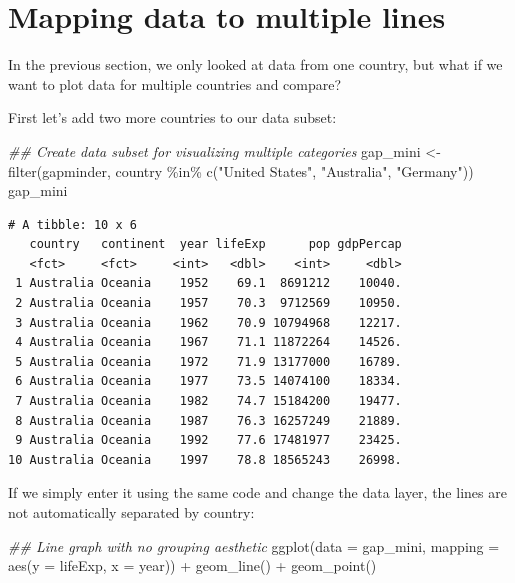 \documentclass[
  letterpaper,
  DIV=11,
  numbers=noendperiod]{scrreprt}
\newenvironment{Shaded}{\begin{snugshade}}{\end{snugshade}}
\newcommand{\AttributeTok}[1]{\textcolor[rgb]{0.40,0.45,0.13}{#1}}
\newcommand{\DocumentationTok}[1]{\textcolor[rgb]{0.37,0.37,0.37}{\textit{#1}}}
\newcommand{\FunctionTok}[1]{\textcolor[rgb]{0.28,0.35,0.67}{#1}}
\newcommand{\NormalTok}[1]{\textcolor[rgb]{0.00,0.23,0.31}{#1}}
\newcommand{\OtherTok}[1]{\textcolor[rgb]{0.00,0.23,0.31}{#1}}
\newcommand{\SpecialCharTok}[1]{\textcolor[rgb]{0.37,0.37,0.37}{#1}}
\newcommand{\StringTok}[1]{\textcolor[rgb]{0.13,0.47,0.30}{#1}}
\begin{document}
\section{Mapping data to multiple
lines}\label{mapping-data-to-multiple-lines}

In the previous section, we only looked at data from one country, but
what if we want to plot data for multiple countries and compare?

First let's add two more countries to our data subset:

\begin{Shaded}
\begin{Highlighting}[]
\DocumentationTok{\#\# Create data subset for visualizing multiple categories}
\NormalTok{gap\_mini }\OtherTok{\textless{}{-}} \FunctionTok{filter}\NormalTok{(gapminder,}
\NormalTok{                   country }\SpecialCharTok{\%in\%} \FunctionTok{c}\NormalTok{(}\StringTok{"United States"}\NormalTok{,}
                                  \StringTok{"Australia"}\NormalTok{,}
                                  \StringTok{"Germany"}\NormalTok{))}
\NormalTok{gap\_mini}
\end{Highlighting}
\end{Shaded}

\begin{verbatim}
# A tibble: 10 x 6
   country   continent  year lifeExp      pop gdpPercap
   <fct>     <fct>     <int>   <dbl>    <int>     <dbl>
 1 Australia Oceania    1952    69.1  8691212    10040.
 2 Australia Oceania    1957    70.3  9712569    10950.
 3 Australia Oceania    1962    70.9 10794968    12217.
 4 Australia Oceania    1967    71.1 11872264    14526.
 5 Australia Oceania    1972    71.9 13177000    16789.
 6 Australia Oceania    1977    73.5 14074100    18334.
 7 Australia Oceania    1982    74.7 15184200    19477.
 8 Australia Oceania    1987    76.3 16257249    21889.
 9 Australia Oceania    1992    77.6 17481977    23425.
10 Australia Oceania    1997    78.8 18565243    26998.
\end{verbatim}

If we simply enter it using the same code and change the data layer, the
lines are not automatically separated by country:

\begin{Shaded}
\begin{Highlighting}[]
\DocumentationTok{\#\# Line graph with no grouping aesthetic}
\FunctionTok{ggplot}\NormalTok{(}\AttributeTok{data =}\NormalTok{ gap\_mini, }
       \AttributeTok{mapping =} \FunctionTok{aes}\NormalTok{(}\AttributeTok{y =}\NormalTok{ lifeExp, }
                     \AttributeTok{x =}\NormalTok{ year)) }\SpecialCharTok{+}
  \FunctionTok{geom\_line}\NormalTok{() }\SpecialCharTok{+}
  \FunctionTok{geom\_point}\NormalTok{()}
\end{Highlighting}
\end{Shaded}
\end{document}
